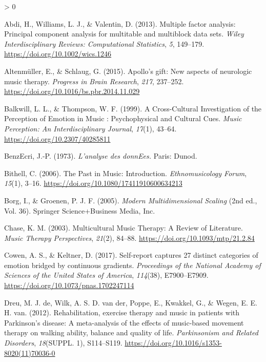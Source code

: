 \documentclass[
  english,
  man]{apa6}
\newlength{\cslhangindent}
\newenvironment{CSLReferences}[2] %
 {%
  \setlength{\parindent}{0pt}
  \ifodd #1 \everypar{\setlength{\hangindent}{\cslhangindent}}\ignorespaces\fi
  \ifnum #2 > 0
  \setlength{\parskip}{#2\baselineskip}
  \fi
 }%
 {}
\begin{document}
\hypertarget{refs}{}
\begin{CSLReferences}{1}{0}
\leavevmode\hypertarget{ref-Abdi2013}{}%
Abdi, H., Williams, L. J., \& Valentin, D. (2013). {Multiple factor analysis: Principal component analysis for multitable and multiblock data sets}. \emph{Wiley Interdisciplinary Reviews: Computational Statistics}, \emph{5}, 149--179. \url{https://doi.org/10.1002/wics.1246}

\leavevmode\hypertarget{ref-Altenmuller2015}{}%
Altenmüller, E., \& Schlaug, G. (2015). {Apollo's gift: New aspects of neurologic music therapy}. \emph{Progress in Brain Research}, \emph{217}, 237--252. \url{https://doi.org/10.1016/bs.pbr.2014.11.029}

\leavevmode\hypertarget{ref-Balkwill1999}{}%
Balkwill, L. L., \& Thompson, W. F. (1999). {A Cross-Cultural Investigation of the Perception of Emotion in Music : Psychophysical and Cultural Cues}. \emph{Music Perception: An Interdisciplinary Journal}, \emph{17}(1), 43--64. \url{https://doi.org/10.2307/40285811}

\leavevmode\hypertarget{ref-Benzecri1973}{}%
BenzEcri, J.-P. (1973). \emph{{L'analyse des donnEes.}} Paris: Dunod.

\leavevmode\hypertarget{ref-Bithell2006}{}%
Bithell, C. (2006). {The Past in Music: Introduction}. \emph{Ethnomusicology Forum}, \emph{15}(1), 3--16. \url{https://doi.org/10.1080/17411910600634213}

\leavevmode\hypertarget{ref-Borg2005}{}%
Borg, I., \& Groenen, P. J. F. (2005). \emph{{Modern Multidimensional Scaling}} (2nd ed., Vol. 36). Springer Science+Business Media, Inc.

\leavevmode\hypertarget{ref-Chase2003}{}%
Chase, K. M. (2003). {Multicultural Music Therapy: A Review of Literature}. \emph{Music Therapy Perspectives}, \emph{21}(2), 84--88. \url{https://doi.org/10.1093/mtp/21.2.84}

\leavevmode\hypertarget{ref-Cowen2017}{}%
Cowen, A. S., \& Keltner, D. (2017). {Self-report captures 27 distinct categories of emotion bridged by continuous gradients}. \emph{Proceedings of the National Academy of Sciences of the United States of America}, \emph{114}(38), E7900--E7909. \url{https://doi.org/10.1073/pnas.1702247114}

\leavevmode\hypertarget{ref-DeDreu2012}{}%
Dreu, M. J. de, Wilk, A. S. D. van der, Poppe, E., Kwakkel, G., \& Wegen, E. E. H. van. (2012). {Rehabilitation, exercise therapy and music in patients with Parkinson's disease: A meta-analysis of the effects of music-based movement therapy on walking ability, balance and quality of life}. \emph{Parkinsonism and Related Disorders}, \emph{18}(SUPPL. 1), S114--S119. \url{https://doi.org/10.1016/s1353-8020(11)70036-0}


\end{CSLReferences}
\end{document}
